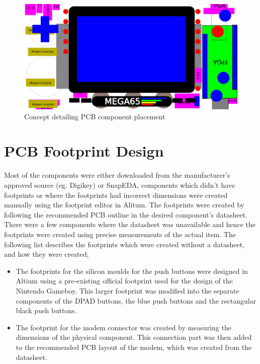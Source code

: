 \begin{figure}
	\includegraphics[width=\linewidth]{Figures/handset-layout-v1-no-PCB-no-cover.pdf}
	\caption{Concept detailing PCB component placement }
	\label{fig:nopcb}
\end{figure}


\section{PCB Footprint Design}
\label{chap6sec4}

	Most of the components were either downloaded from the manufacturer's approved source (eg. Digikey) or SnapEDA, components which didn't have footprints or where the footprints had incorrect dimensions were created manually using the footprint editor in Alitum. The footprints were created by following the recommended PCB outline in the desired component's datasheet. There were a few components where the datasheet was unavailable and hence the footprints were created using precise measurements of the actual item. The following list describes the footprints which were created without a datasheet, and how they were created;

\begin{itemize}
\item The footprints for the silicon moulds for the push buttons were designed in Altium using a pre-existing official footprint used for the design of the Nintendo Gameboy. This larger footprint was modified into the separate components of the DPAD buttons, the blue push buttons and the rectangular black push buttons.
\item The footprint for the modem connector was created by measuring the dimensions of the physical component. This connection part was then added to the recommended PCB layout of the modem, which was created from the datasheet. 
\end{itemize}

